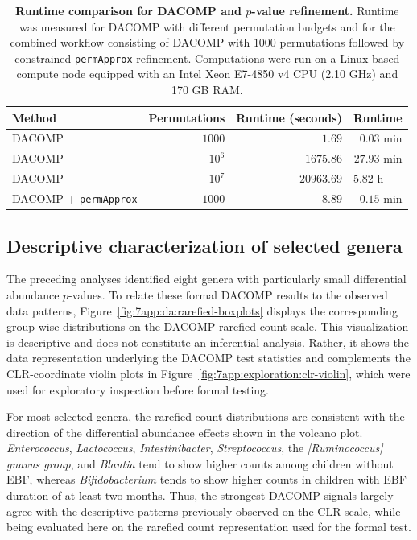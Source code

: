 \begin{table}[!htb]
\centering
\caption{\label{tab:7app:da:runtime}\textbf{Runtime comparison for DACOMP and $p$-value refinement.} Runtime was measured for DACOMP with different permutation budgets and for the combined workflow consisting of DACOMP with $1000$ permutations followed by constrained \texttt{permApprox} refinement. Computations were run on a Linux-based compute node equipped with an Intel Xeon E7-4850 v4 CPU (2.10 GHz) and 170 GB RAM.}
\begin{tabular}{lrrr}
\toprule
Method & Permutations & Runtime (seconds) & Runtime \\
\midrule
DACOMP & $1000$ & $1.69$ & $0.03$ min \\
DACOMP & $10^6$ & $1675.86$ & $27.93$ min \\
DACOMP & $10^7$ & $20963.69$ & $5.82$ h~~~\, \\
DACOMP + \texttt{permApprox} & $1000$ & $8.89$ & $0.15$ min \\
\bottomrule
\end{tabular}
\end{table}

\subsection{Descriptive characterization of selected genera}
\label{sec:7app:differential-abundance:selected-genera}

The preceding analyses identified eight genera with particularly small differential abundance $p$-values. To relate these formal DACOMP results to the observed data patterns, Figure~\ref{fig:7app:da:rarefied-boxplots} displays the corresponding group-wise distributions on the DACOMP-rarefied count scale. This visualization is descriptive and does not constitute an  inferential analysis. Rather, it shows the data representation underlying the DACOMP test statistics and complements the CLR-coordinate violin plots in Figure~\ref{fig:7app:exploration:clr-violin}, which were used for exploratory inspection before formal testing.

For most selected genera, the rarefied-count distributions are consistent with the direction of the differential abundance effects shown in the volcano plot. \emph{Enterococcus}, \emph{Lactococcus}, \emph{Intestinibacter}, \emph{Streptococcus}, the \emph{[Ruminococcus] gnavus group}, and \emph{Blautia} tend to show higher counts among children without EBF, whereas \emph{Bifidobacterium} tends to show higher counts in children with EBF duration of at least two months. Thus, the strongest DACOMP signals largely agree with the descriptive patterns previously observed on the CLR scale, while being evaluated here on the rarefied count representation used for the formal test.


